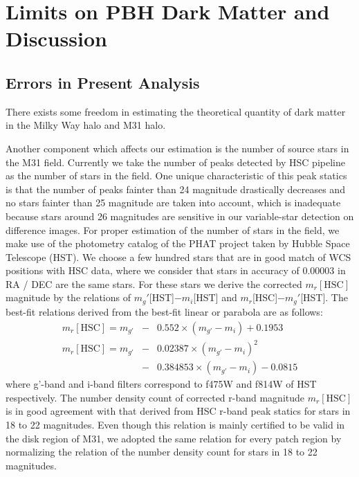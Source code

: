 \documentclass[iop, apj]{emulateapj}
\newcommand{\?}{\stackrel{?}{=}}
\begin{document}
\section{Limits on PBH Dark Matter and Discussion}
\subsection{Errors in Present Analysis}

There exists some freedom in estimating the theoretical quantity of 
dark matter in the Milky Way halo and M31 halo. 

Another component which affects our estimation is 
the number of source stars in the M31 field. 
Currently we take the number of peaks detected by HSC pipeline as the 
number of stars in the field. 
One unique characteristic of this peak statics is that 
the number of peaks fainter than 24 magnitude drastically decreases and 
no stars fainter than 25 magnitude are taken into account, which is 
inadequate because stars around 26 magnitudes are sensitive 
in our variable-star detection on difference images. 
For proper estimation of the number of stars in the field, 
we make use of the photometry catalog of the PHAT project taken by Hubble Space Telescope (HST). 
We choose a few hundred stars that are in good match of WCS positions with 
HSC data, where we consider that stars in accuracy of 0.00003 in RA / DEC are the same stars. 
For these stars we derive the corrected $m_r\mathrm{[HSC]}$ magnitude 
by the relations of $m_g'$[HST]$-m_i$[HST] and $m_r$[HSC]$-m_g'$[HST]. 
The best-fit relations derived from the best-fit linear or parabola are as follows: %
%
\begin{eqnarray}
m_r\mathrm{[HSC]}=m_{g'}&-&0.552\times(m_{g'}-m_i)+0.1953\\
m_r\mathrm{[HSC]}=m_{g'}&-&0.02387\times(m_{g'}-m_i)^2\nonumber\\
&-&0.384853\times(m_{g'}-m_i)-0.0815
\end{eqnarray}
%
where g'-band and i-band filters correspond to f475W and f814W of HST respectively. 
The number density count of corrected r-band magnitude $m_r\mathrm{[HSC]}$ 
is in good agreement with that derived from HSC r-band peak statics for 
stars in 18 to 22 magnitudes. 
Even though this relation is mainly certified to be valid in the disk region of M31, 
we adopted the same relation for every patch region by 
normalizing the relation of the number density count for stars in 18 to 22 magnitudes. 
\end{document}
